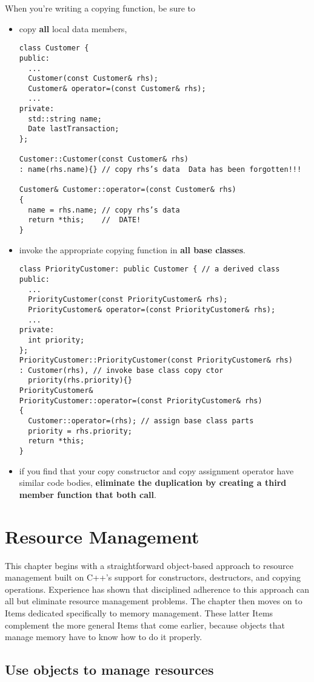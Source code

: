 \documentclass[a4paper,twoside]{article}
\theoremstyle{definition}
\theoremstyle{remark}
\numberwithin{equation}{section}
\begin{document}
When you're writing a copying function, be sure to
\begin{itemize}
\item copy \textbf{all} local data members,
\begin{verbatim}
class Customer {
public:
  ...
  Customer(const Customer& rhs);
  Customer& operator=(const Customer& rhs);
  ...
private:
  std::string name;
  Date lastTransaction;
};

Customer::Customer(const Customer& rhs)
: name(rhs.name){} // copy rhs’s data  Data has been forgotten!!!

Customer& Customer::operator=(const Customer& rhs)
{
  name = rhs.name; // copy rhs’s data
  return *this;    //  DATE!
}
\end{verbatim}
\item invoke the appropriate copying function in \textbf{all base
    classes}.
\begin{verbatim}
class PriorityCustomer: public Customer { // a derived class
public:
  ...
  PriorityCustomer(const PriorityCustomer& rhs);
  PriorityCustomer& operator=(const PriorityCustomer& rhs);
  ...
private:
  int priority;
};
PriorityCustomer::PriorityCustomer(const PriorityCustomer& rhs)
: Customer(rhs), // invoke base class copy ctor
  priority(rhs.priority){}
PriorityCustomer&
PriorityCustomer::operator=(const PriorityCustomer& rhs)
{
  Customer::operator=(rhs); // assign base class parts
  priority = rhs.priority;
  return *this;
}
\end{verbatim}
\item if you find that your copy constructor and copy assignment
operator have similar code bodies, \textbf{eliminate the duplication by
creating a third member function that both call}.
\end{itemize}

\section{Resource Management}

This chapter begins with a straightforward object-based approach to
resource management built on C++'s support for constructors,
destructors, and copying operations. Experience has shown that
disciplined adherence to this approach can all but eliminate resource
management problems. The chapter then moves on to Items dedicated
specifically to memory management. These latter Items complement
the more general Items that come earlier, because objects that manage
memory have to know how to do it properly.

\subsection{Use objects to manage resources}
\label{sec:Item-13}
\end{document}
